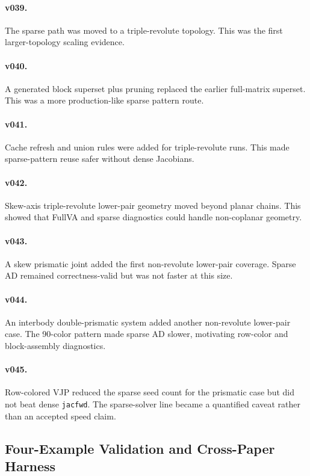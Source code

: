 \documentclass[10pt]{article}
\begin{document}
\paragraph{v039.}
The sparse path was moved to a triple-revolute topology. This was the first
larger-topology scaling evidence.

\paragraph{v040.}
A generated block superset plus pruning replaced the earlier full-matrix
superset. This was a more production-like sparse pattern route.

\paragraph{v041.}
Cache refresh and union rules were added for triple-revolute runs. This made
sparse-pattern reuse safer without dense Jacobians.

\paragraph{v042.}
Skew-axis triple-revolute lower-pair geometry moved beyond planar chains. This
showed that FullVA and sparse diagnostics could handle non-coplanar geometry.

\paragraph{v043.}
A skew prismatic joint added the first non-revolute lower-pair coverage. Sparse
AD remained correctness-valid but was not faster at this size.

\paragraph{v044.}
An interbody double-prismatic system added another non-revolute lower-pair
case. The 90-color pattern made sparse AD slower, motivating row-color and
block-assembly diagnostics.

\paragraph{v045.}
Row-colored VJP reduced the sparse seed count for the prismatic case but did
not beat dense \texttt{jacfwd}. The sparse-solver line became a quantified
caveat rather than an accepted speed claim.

\subsection{Four-Example Validation and Cross-Paper Harness}
\end{document}
